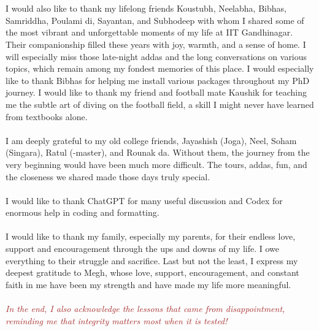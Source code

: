 \documentclass[11pt,a4paper,oneside]{book}
\makeatletter
\newcommand{\thesisstatictableofcontents}{%
  \begingroup
  \def\@starttoc##1{\makeatletter\makeatother}%
  \tableofcontents
  \endgroup
}
\newcommand{\thesisstaticlistoffigures}{%
  \begingroup
  \def\@starttoc##1{\makeatletter\makeatother}%
  \listoffigures
  \endgroup
}
\makeatother
\begin{document}
\\\\
I would also like to thank my lifelong friends Koustubh, Neelabha, Bibhas, Samriddha, Poulami di, Sayantan, and Subhodeep with whom I shared some of the most vibrant and unforgettable moments of my life at IIT Gandhinagar. Their companionship filled these years with joy, warmth, and a sense of home. I will especially miss those late-night addas and the long conversations on various topics, which remain among my fondest memories of this place. I would especially like to thank Bibhas for helping me install various packages throughout my PhD journey. I would like to thank my friend and football mate Kaushik for teaching me the subtle art of diving on the football field, a skill I might never have learned from textbooks alone. 
\\\\
I am deeply grateful to my old college friends, Jayashish (Joga), Neel, Soham (Singara), Ratul (-master), and Rounak da. Without them, the journey from the very beginning would have been much more difficult. The tours, addas, fun, and the closeness we shared made those days truly special.\\\\
I would like to thank ChatGPT for many useful discussion and Codex for enormous help in coding and formatting.
\\\\
 I would like to thank my family, especially my parents, for their endless love, support and encouragement through the ups and downs of my life. I owe everything to their struggle and sacrifice. Last but not the least, I express my deepest gratitude to Megh, whose love, support, encouragement, and constant faith in me have been my strength and have made my life more meaningful.
\\\\
\textit{\textcolor{brown}{In the end, I also acknowledge the lessons that came from disappointment, reminding me that integrity matters most when it is tested!}}
\newpage
\thesisstatictableofcontents
\clearpage
\thesisstaticlistoffigures
\clearpage

\mainmatter
\end{document}
